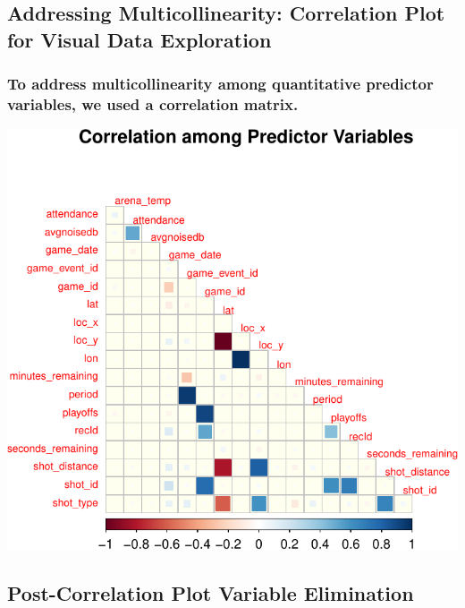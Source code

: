 \documentclass[]{article}
\begin{document}
\hypertarget{addressing-multicollinearity-correlation-plot-for-visual-data-exploration}{%
\subsection{\texorpdfstring{\textbf{Addressing Multicollinearity:
Correlation Plot for Visual Data
Exploration}}{Addressing Multicollinearity: Correlation Plot for Visual Data Exploration}}\label{addressing-multicollinearity-correlation-plot-for-visual-data-exploration}}

\hypertarget{to-address-multicollinearity-among-quantitative-predictor-variables-we-used-a-correlation-matrix.}{%
\subsubsection{To address multicollinearity among quantitative predictor
variables, we used a correlation
matrix.}\label{to-address-multicollinearity-among-quantitative-predictor-variables-we-used-a-correlation-matrix.}}

\includegraphics{Final_Project_Applied_files/figure-latex/Multicollinearity-1.pdf}

\hypertarget{post-correlation-plot-variable-elimination}{%
\subsection{\texorpdfstring{\textbf{Post-Correlation Plot Variable
Elimination}}{Post-Correlation Plot Variable Elimination}}\label{post-correlation-plot-variable-elimination}}
\end{document}

